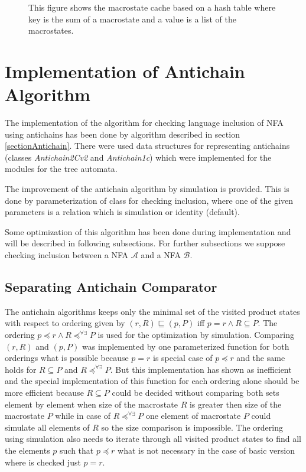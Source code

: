 \begin{figure}[bt]
\begin{center}
  
  \caption{This figure shows the macrostate cache based on a hash table where key is the sum of a macrostate and a value is a list of the macrostates.}
  \label{figMacroCache}
\end{center}
\end{figure}

\section{Implementation of Antichain Algorithm}
The implementation of the algorithm for checking language inclusion of NFA using antichains has been done by algorithm described in section 
\ref{sectionAntichain}.  There were used data structures for representing antichains (classes \emph{Antichain2Cv2} and \emph{Antichain1c}) which
were implemented for the modules for the tree automata. 

The improvement of the antichain algorithm by simulation is provided. This is done by parameterization of class for checking inclusion, where one of the given 
parameters is a relation which is simulation or identity (default).

Some optimization of this algorithm has been done during implementation and will be described in following subsections. For further subsections we suppose
checking inclusion between a NFA $\mathcal{A}$ and a NFA $\mathcal{B}$.

\subsection{Separating Antichain Comparator}
The antichain algorithms keeps only the minimal set of the visited product states with respect to ordering given by $(r,R)\sqsubseteq (p,P)$
iff $p=r \wedge R \subseteq P$. The ordering $p\preceq r \wedge R\preceq^{\forall\exists}P$ is used for the optimization by simulation.
Comparing $(r,R)$ and $(p,P)$ was implemented by one parameterized function for both orderings what is possible because $p=r$ is special case of $p\preceq r$ 
and the same holds for $R \subseteq P$ and $R\preceq^{\forall\exists}P$. But this implementation has shown as inefficient and the special implementation of
this function for each ordering alone should be more efficient because $R\subseteq P$ could be decided 
without comparing both sets element by element when size of the macrostate $R$ is greater then size of the macrostate $P$ while in case of
$R\preceq^{\forall\exists}P$ one element of macrostate $P$ could simulate all elements of $R$ so the size comparison is impossible.
The ordering using simulation also needs to iterate through all visited product states to find all the elements $p$ such that $p\preceq r$ what 
is not necessary in the case of basic version where is checked just $p=r$.

